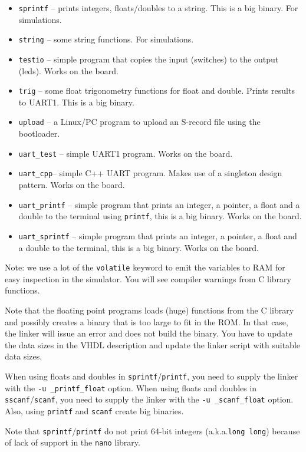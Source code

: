 \documentclass[12pt]{article}
\begin{document}
\begin{itemize}
\item \lstinline|sprintf| -- prints integers, floats/doubles to a string. This is a big binary. For simulations.
\item \lstinline|string| -- some string functions. For simulations.
\item \lstinline|testio| -- simple program that copies the input (switches) to the output (leds). Works on the board.
\item \lstinline|trig| -- some float trigonometry functions for float and double. Prints results to UART1. This is a big binary.
\item \lstinline|upload| -- a Linux/PC program to upload an S-record file using the bootloader.
\item \lstinline|uart_test| -- simple UART1 program. Works on the board.
\item \lstinline|uart_cpp|-- simple C++ UART program. Makes use of a singleton design pattern. Works on the board.
\item \lstinline|uart_printf| -- simple program that prints an integer, a pointer, a float and a double to the terminal using \lstinline|printf|, this is a big binary. Works on the board.
\item \lstinline|uart_sprintf| -- simple program that prints an integer, a pointer, a float and a double to the terminal, this is a big binary. Works on the board.
\end{itemize} 

Note: we use a lot of the \lstinline|volatile| keyword to emit the variables to RAM for easy inspection in the simulator. You will see compiler warnings from C library functions.

Note that the floating point programs loads (huge) functions from the C library and possibly creates a binary that is too large to fit in the ROM. In that case, the linker will issue an error and does not build the binary. You have to update the data sizes in the VHDL description and update the linker script with suitable data sizes.

When using floats and doubles in \lstinline|sprintf|/\lstinline|printf|, you need to supply the linker with the \lstinline|-u _printf_float| option. When using floats and doubles in \lstinline|sscanf|/\lstinline|scanf|, you need to supply the linker with the \lstinline|-u _scanf_float| option. Also, using \lstinline|printf| and \lstinline|scanf| create big binaries.

Note that \lstinline|sprintf|/\lstinline|printf| do not print 64-bit integers (a.k.a.\@ \lstinline|long long|) because of lack of support in the \lstinline|nano| library.
\end{document}
